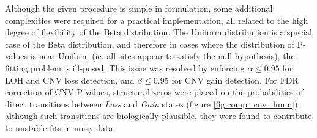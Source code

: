 \documentclass[thesis.tex]{subfiles}
\begin{document}
Although the given procedure is simple in formulation, some additional complexities were required for a practical implementation, all related to the high degree of flexibility of the Beta distribution.  The Uniform distribution is a special case of the Beta distribution, and therefore in cases where the distribution of P-values is near Uniform (ie. all sites appear to satisfy the null hypothesis), the fitting problem is ill-posed.  This issue was resolved by enforcing $\alpha \leq 0.95$ for \gls{LOH} and \gls{CNV} loss detection, and $\beta \leq 0.95$ for \gls{CNV} gain detection.  For \gls{FDR} correction of \gls{CNV} P-values, structural zeros were placed on the probabilities of direct transitions between \emph{Loss} and \emph{Gain} states (figure \ref{fig:comp_cnv_hmm}); although such transitions are biologically plausible, they were found to contribute to unstable fits in noisy data.

%
%
\end{document}
